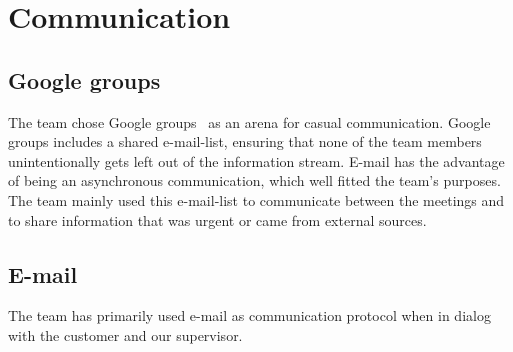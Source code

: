 \section{Communication}
\subsection{Google groups}
The team chose Google groups~\cite{ggroups} as an arena for casual communication. Google groups includes a shared e-mail-list, ensuring that none of the team members unintentionally gets left out of the information stream. E-mail has the advantage of being an asynchronous communication, which well fitted the team's purposes. The team mainly used this e-mail-list to communicate between the meetings and to share information that was urgent or came from external sources. 

\subsection{E-mail}
The team has primarily used e-mail as communication protocol when in dialog with the customer and our supervisor.